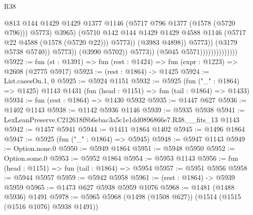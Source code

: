 \begin{lexlean}{R38}
\begin{coremodule}
                                                      @813
                                                      @144
                                                      @1429
                                                      @1429
                                                      @1377
                                                      @1146
                                                      (@5717 @796 @1377 (@1578 (@5720 @796)))
                                                      @5773)
                                                    @3965)
                                                  (@5710
                                                    @142
                                                    @144
                                                    @1429
                                                    @1429
                                                    @4588
                                                    @1146
                                                    (@5717 @22 @4588 (@1578 (@5720 @22)))
                                                    @5773))
                                                (@3983 @4898))
                                              @5773))
                                          (@3179 @5738 @5740))
                                        @5773))
                                    (@3990 @5702))
                                  @5773))
                              (@5045 @5571))))))))))))))
@5922 := fun (st : @1391) => fun (rest : @1424) => fun (expr : @1223) => @2608 (@2775 @5917)
@5923 := (rest : @1864) -> @1425
@5924 := List.casesOn.{1, 0}
@5925 := @5924 @1151
@5932 := @5925
    (fun ("_" : @1864) => @1425)
    @1143
    @1431
    (fun (head : @1151) => fun (tail : @1864) => @1433)
@5934 := fun (rest : @1864) => @1430 @5932
@5935 := @1447 @627
@5936 := @1402 @1143
@5938 := @1142 @5936 @1146
@5939 := @5935 @5938
@5941 := LexLeanPreserve.C212618f8b6ebac3a5c1e1dd0896866e7.R38.__fits_13 @1143
@5942 := @1457 @5941
@5944 := @1411 @1864 @1402
@5945 := @1496 @1864
@5947 := @5925 (fun ("_" : @1864) => @5945)
@5948 := @5947 @1143
@5949 := Option.none.{0}
@5950 := @5949 @1864
@5951 := @5948 @5950
@5952 := Option.some.{0}
@5953 := @5952 @1864
@5954 := @5953 @1143
@5956 := fun (head : @1151) => fun (tail : @1864) => @5954
@5957 := @5951 @5956
@5958 := @5944 @5957
@5959 := @5942 @5958
@5961 := (rest : @1864) -> @5939 @5959
@5965 := @1473 @627 @5938 @5959 @1076
@5968 := @1481 (@1488 @5936) @1491
@5978 := @5965 @5968 (@1498 (@1508 @627)) (@1514 (@1515 (@1516 @1076) @5938 @1491))

\end{coremodule}
\end{lexlean}
